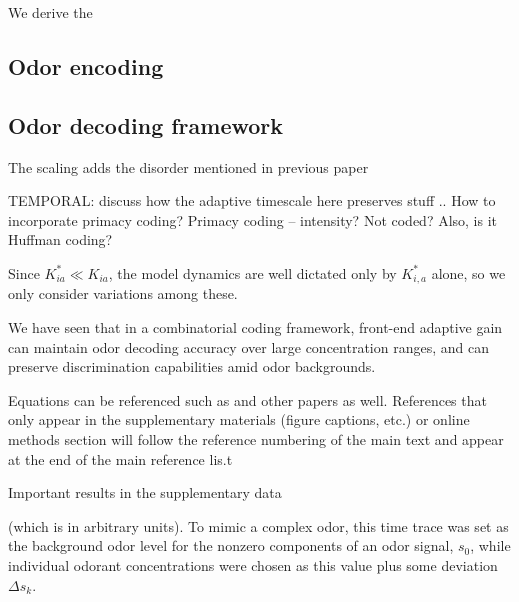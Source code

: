 We derive the 

\subsection{Odor encoding}

\subsection{Odor decoding framework}


The scaling adds the disorder mentioned in previous paper

TEMPORAL: discuss how the adaptive timescale here preserves stuff .. How to incorporate primacy coding?
Primacy coding -- intensity? Not coded? Also, is it Huffman coding?


Since $K^*_{ia} \ll K_{ia}$, the model dynamics are well dictated only by $K^*_{i, a}$ alone, so we only consider variations among these. 

We have seen that in a combinatorial coding framework, front-end adaptive gain can maintain odor decoding accuracy over large concentration ranges, and can preserve discrimination capabilities amid odor backgrounds. 


Equations can be referenced such as and other papers as well. References
that only appear in the supplementary materials (figure captions, etc.) or online methods section
will follow the reference numbering of the main text and appear at the end of the main reference
lis.t

Important results in the supplementary data

(which is in arbitrary units). To mimic a complex odor, this time trace was set as the background odor level for the nonzero components of an odor signal, $s_0$, while individual odorant concentrations were chosen as this value plus some deviation $\Delta s_k$. 
